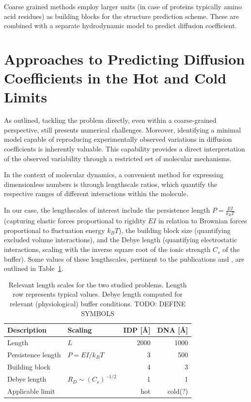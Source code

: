 \documentclass{doctoral}
\begin{document}
Coarse grained methods employ larger units (in case of proteins typically amino acid residues) as building blocks for the structure prediction scheme. These are combined with a separate hydrodynamic model to predict diffusion coefficient.

\section{Approaches to Predicting Diffusion Coefficients in the Hot and Cold Limits}

As outlined, tackling the problem directly, even within a coarse-grained perspective, still presents numerical challenges. Moreover, identifying a minimal model capable of reproducing experimentally observed variations in diffusion coefficients is inherently valuable. This capability provides a direct interpretation of the observed variability through a restricted set of molecular mechanisms.

In the context of molecular dynamics, a convenient method for expressing dimensionless numbers is through lengthscale ratios, which quantify the respective ranges of different interactions within the molecule.

In our case, the lengthscales of interest include the persistence length $P = \frac{EI}{k_B T}$ (capturing elastic forces proportional to rigidity $EI$ in relation to Brownian forces proportional to fluctuation energy $k_B T$), the building block size (quantifying excluded volume interactions), and the Debye length (quantifying electrostatic interactions, scaling with the inverse square root of the ionic strength $C_s$ of the buffer). Some values of these lengthscales, pertinent to the publications \cite{Waszkiewicz_2023_dna} and \cite{Waszkiewicz_2024_mda}, are outlined in Table~\ref{tab:lengthscales}.

\begin{table}[htbp]
    \centering
    \begin{tabular}{llrr}
        \toprule
        \textbf{Description} & 
        \textbf{Scaling} & 
        \textbf{IDP [\AA]} & 
        \textbf{DNA [\AA]} \\
        \midrule
        Length            & $L$                  & 2000&  1000   \\
        Persistence length& $P = EI / k_B T$     & 3   &  500    \\
        Building block    &                      & 4 &  3        \\
        Debye length      & $R_D \sim (C_s)^{-1/2}$& 1 &  1        \\
        \midrule
        Applicable limit  &                      & hot &  cold(?)\\
        \bottomrule
    \end{tabular}    
    \caption{Relevant length scales for the two studied problems. Length row represents typical values. Debye length computed for relevant (physiological) buffer conditions. TODO: DEFINE SYMBOLS}
    \label{tab:lengthscales}
\end{table}
\end{document}
